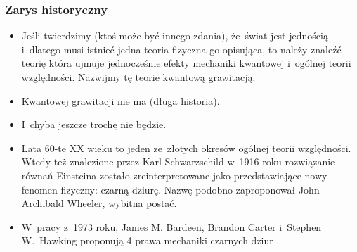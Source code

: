 \documentclass[10pt,t]{beamer}
\begin{document}
\begin{frame}
  \frametitle{Zarys historyczny}


  \begin{itemize}
    \RaggedRight

  \item Jeśli twierdzimy (ktoś może być innego zdania), że~świat
    jest jednością i~dlatego musi istnieć jedna teoria fizyczna go
    opisująca, to należy znaleźć teorię która ujmuje jednocześnie
    efekty mechaniki kwantowej i~ogólnej teorii względności.
    Nazwijmy tę teorie kwantową grawitacją.

  \item Kwantowej grawitacji nie ma (długa historia).

  \item I~chyba jeszcze trochę nie będzie.

  \item Lata 60-te XX wieku to jeden ze~złotych okresów ogólnej
    teorii względności. Wtedy też znalezione przez Karl
    Schwarzschild w~1916 roku rozwiązanie równań Einsteina zostało
    zreinterpretowane jako przedstawiające nowy fenomen fizyczny:
    czarną dziurę. Nazwę podobno zaproponował John Archibald
    Wheeler, wybitna postać.

  \item W~pracy z~1973 roku, James M. Bardeen, Brandon Carter
    i~Stephen W.~Hawking proponują 4 prawa mechaniki czarnych dziur
    \cite{BardeenCarterHawkingFourLawsOfBHMechanics1973}.

  \end{itemize}

\end{frame}
\end{document}
